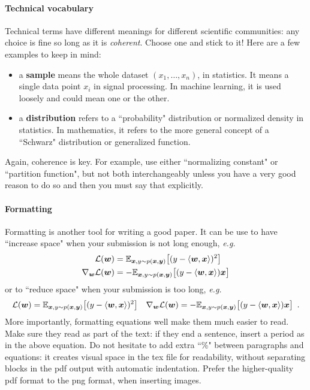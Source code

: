 \paragraph{Technical vocabulary} Technical terms have different meanings for different scientific communities: any choice is fine so long as it is \textit{coherent}. Choose one and stick to it! Here are a few examples to keep in mind:
%
\begin{itemize}
    
    \item[] a \textbf{sample}
    means the whole dataset $(x_1, \ldots, x_n)$, in statistics. It means a single data point $x_i$ in signal processing. In machine learning, it is used loosely and could mean one or the other.

    \item[] a \textbf{distribution}
    refers to a ``probability" distribution or normalized density in statistics. In mathematics, it refers to the more general concept of a ``Schwarz" distribution or generalized function.

\end{itemize}
%
Again, coherence is key. For example, use either ``normalizing constant" or ``partition function", but not both interchangeably unless you have a very good reason to do so and then you must say that explicitly. 

\paragraph{Formatting} Formatting is another tool for writing a good paper. It can be use to have ``increase space" when your submission is not long enough, \textit{e.g.}
%
\begin{align*}
    \mathcal{L}({\bm{w}}) 
    & =
    \mathbb{E}_{{\bm{x}}, y \sim p({\bm{x}}, {\bm{y}})} \big[ 
    (y - \langle {\bm{w}}, {\bm{x}} \rangle)^2 
    \big]
    \\
    \nabla_{{\bm{w}}} \mathcal{L}({\bm{w}}) 
    & =
    -\mathbb{E}_{{\bm{x}}, y \sim p({\bm{x}}, {\bm{y}})} \big[ 
    (y - \langle {\bm{w}}, {\bm{x}} \rangle) {\bm{x}}
    \big]
\end{align*}
%
or to ``reduce space" when your submission is too long, \textit{e.g.}
%
\begin{alignat*}{2}
    \mathcal{L}({\bm{w}}) 
    =
    \mathbb{E}_{{\bm{x}}, y \sim p({\bm{x}}, {\bm{y}})} \big[ 
    (y - \langle {\bm{w}}, {\bm{x}} \rangle)^2 
    \big]
    \hspace{1em}
    \nabla_{{\bm{w}}} \mathcal{L}({\bm{w}}) 
    =
    -\mathbb{E}_{{\bm{x}}, y \sim p({\bm{x}}, {\bm{y}})} \big[ 
    (y - \langle {\bm{w}}, {\bm{x}} \rangle) {\bm{x}}
    \big]
    \enspace .
\end{alignat*}
%
More importantly, formatting equations well make them much easier to read. Make sure they read as part of the text: if they end a sentence, insert a period as in the above equation. Do not hesitate to add extra ``\%" between paragraphs and equations: it creates visual space in the tex file for readability, without separating blocks in the pdf output with automatic indentation. Prefer the higher-quality pdf format to the png format, when inserting images. 


